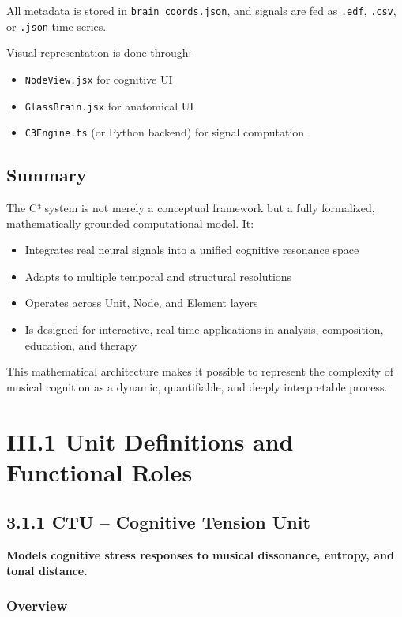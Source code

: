 \documentclass[10pt]{article}
\begin{document}
All metadata is stored in \texttt{brain\_coords.json}, and signals are fed as \texttt{.edf}, \texttt{.csv}, or \texttt{.json} time series.

Visual representation is done through:

\begin{itemize}
    \item \texttt{NodeView.jsx} for cognitive UI
    \item \texttt{GlassBrain.jsx} for anatomical UI
    \item \texttt{C3Engine.ts} (or Python backend) for signal computation
\end{itemize}

\subsection*{Summary}

The C³ system is not merely a conceptual framework but a fully formalized, mathematically grounded computational model. It:

\begin{itemize}
    \item Integrates real neural signals into a unified cognitive resonance space
    \item Adapts to multiple temporal and structural resolutions
    \item Operates across Unit, Node, and Element layers
    \item Is designed for interactive, real-time applications in analysis, composition, education, and therapy
\end{itemize}

This mathematical architecture makes it possible to represent the complexity of musical cognition as a dynamic, quantifiable, and deeply interpretable process.

\section*{III.1 Unit Definitions and Functional Roles}

\subsection*{3.1.1 CTU – Cognitive Tension Unit}

\textbf{Models cognitive stress responses to musical dissonance, entropy, and tonal distance.}

\subsubsection*{Overview}
\end{document}
